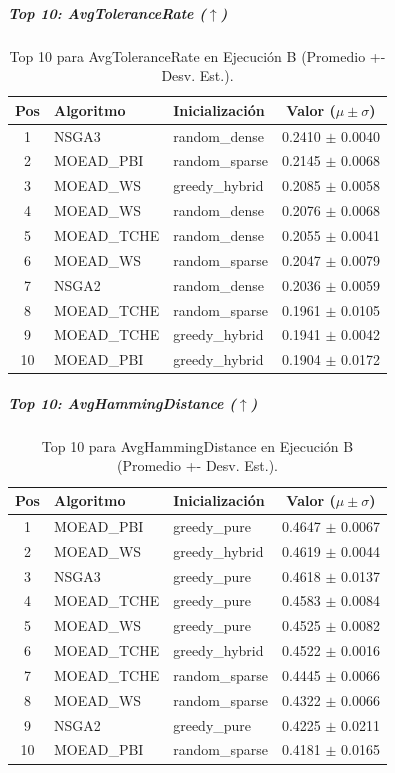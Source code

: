 \documentclass[a4paper,10pt]{article}
\begin{document}
\subparagraph{Top 10: AvgToleranceRate ($\uparrow$)}
\begin{table}[H]
    \centering
    \begin{tabular}{cllc}
        \toprule
        Pos & Algoritmo & Inicialización & Valor ($\mu \pm \sigma$) \\
        \midrule
        1 & NSGA3 & random\_dense & 0.2410 $\pm$ 0.0040 \\
        2 & MOEAD\_PBI & random\_sparse & 0.2145 $\pm$ 0.0068 \\
        3 & MOEAD\_WS & greedy\_hybrid & 0.2085 $\pm$ 0.0058 \\
        4 & MOEAD\_WS & random\_dense & 0.2076 $\pm$ 0.0068 \\
        5 & MOEAD\_TCHE & random\_dense & 0.2055 $\pm$ 0.0041 \\
        6 & MOEAD\_WS & random\_sparse & 0.2047 $\pm$ 0.0079 \\
        7 & NSGA2 & random\_dense & 0.2036 $\pm$ 0.0059 \\
        8 & MOEAD\_TCHE & random\_sparse & 0.1961 $\pm$ 0.0105 \\
        9 & MOEAD\_TCHE & greedy\_hybrid & 0.1941 $\pm$ 0.0042 \\
        10 & MOEAD\_PBI & greedy\_hybrid & 0.1904 $\pm$ 0.0172 \\
        \bottomrule
    \end{tabular}
    \caption{Top 10 para AvgToleranceRate en Ejecución B (Promedio +- Desv. Est.).}
\end{table}

\subparagraph{Top 10: AvgHammingDistance ($\uparrow$)}
\begin{table}[H]
    \centering
    \begin{tabular}{cllc}
        \toprule
        Pos & Algoritmo & Inicialización & Valor ($\mu \pm \sigma$) \\
        \midrule
        1 & MOEAD\_PBI & greedy\_pure & 0.4647 $\pm$ 0.0067 \\
        2 & MOEAD\_WS & greedy\_hybrid & 0.4619 $\pm$ 0.0044 \\
        3 & NSGA3 & greedy\_pure & 0.4618 $\pm$ 0.0137 \\
        4 & MOEAD\_TCHE & greedy\_pure & 0.4583 $\pm$ 0.0084 \\
        5 & MOEAD\_WS & greedy\_pure & 0.4525 $\pm$ 0.0082 \\
        6 & MOEAD\_TCHE & greedy\_hybrid & 0.4522 $\pm$ 0.0016 \\
        7 & MOEAD\_TCHE & random\_sparse & 0.4445 $\pm$ 0.0066 \\
        8 & MOEAD\_WS & random\_sparse & 0.4322 $\pm$ 0.0066 \\
        9 & NSGA2 & greedy\_pure & 0.4225 $\pm$ 0.0211 \\
        10 & MOEAD\_PBI & random\_sparse & 0.4181 $\pm$ 0.0165 \\
        \bottomrule
    \end{tabular}
    \caption{Top 10 para AvgHammingDistance en Ejecución B (Promedio +- Desv. Est.).}
\end{table}
\end{document}

